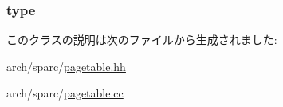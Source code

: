 \label{classSparcISA_1_1PageTableEntry_a09092dab7a486a492b9b5fd4adee5c48}
\hypertarget{classSparcISA_1_1PageTableEntry_a92d9245effbf226773b822ad81debaa7}{
\subsubsection[{type}]{ {\bf type}}}
\label{classSparcISA_1_1PageTableEntry_a92d9245effbf226773b822ad81debaa7}


このクラスの説明は次のファイルから生成されました:\begin{DoxyCompactItemize}
\item 
arch/sparc/\hyperlink{sparc_2pagetable_8hh}{pagetable.hh}\item 
arch/sparc/\hyperlink{sparc_2pagetable_8cc}{pagetable.cc}\end{DoxyCompactItemize}
